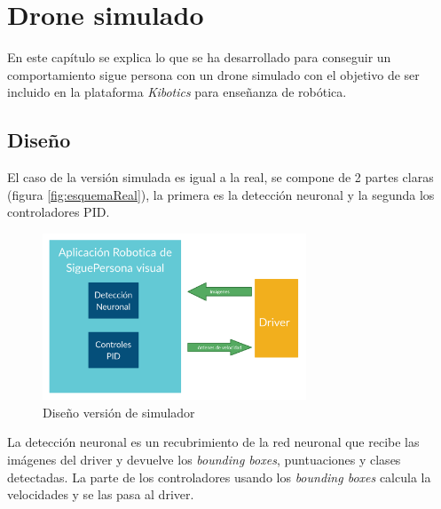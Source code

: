 \chapter{Drone simulado}\label{cap.simulado}
En este capítulo se explica lo que se ha desarrollado para conseguir un comportamiento sigue persona con un drone simulado con el objetivo de ser incluido en la plataforma \textit{Kibotics} para enseñanza de robótica.

\section{Diseño}
El caso de la versión simulada es igual a la real, se compone de 2 partes claras (figura \ref{fig:esquemaReal}), la primera es la detección neuronal y la segunda los controladores PID.
\begin{figure}[H]
  \begin{center}
    \includegraphics[width=0.7\textwidth]{figures/simulado/esquema.png}
		\caption{Diseño versión de simulador}
		\label{fig:esquemaSim}
		\end{center}
\end{figure}

La detección neuronal es un recubrimiento de la red neuronal que recibe las imágenes del driver y devuelve los \textit{bounding boxes}, puntuaciones y clases detectadas. 
La parte de los controladores usando los \textit{bounding boxes} calcula la velocidades y se las pasa al driver.
